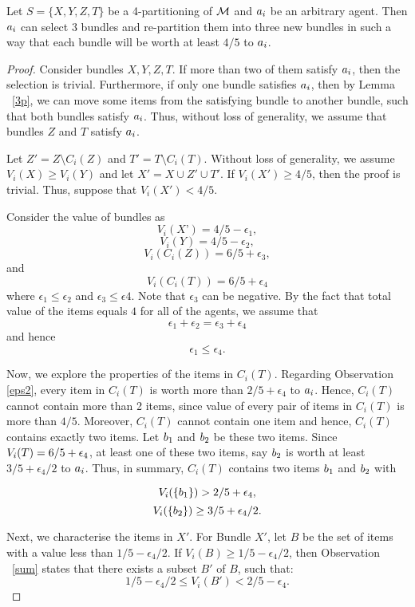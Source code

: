 \begin{lemma}
\label{core}
Let $S=\{X,Y,Z,T\}$ be a 4-partitioning of $\cal M$ and $a_i$ be an arbitrary agent. Then $a_i$ can select $3$ bundles and re-partition them into three new bundles in such a way that each bundle will be worth at least $4/5$ to $a_i$.
\end{lemma}
\begin{proof}
Consider bundles $X,Y,Z,T$. If more than two of them satisfy $a_i$, then the selection is trivial. Furthermore, if only one bundle satisfies $a_i$, then by Lemma ~\ref{3p}, we can move some items from the satisfying bundle to another bundle, such that both bundles satisfy $a_i$. Thus, without loss of generality, we assume that bundles $Z$ and $T$ satisfy $a_i$. 


Let $Z' = Z \setminus C_i(Z)$ and $T'= T \setminus C_i(T)$. Without loss of generality, we assume $V_i(X) \geq V_i(Y)$ and let $X' = X \cup Z' \cup T'$. If $V_i(X') \ge 4/5$, then the proof is trivial. Thus, suppose that $V_i(X') < 4/5$.

Consider the value of bundles as $$V_i(X’)=4/5 - \epsilon_1,$$ $$V_i(Y)=4/5 - \epsilon_2,$$ $$V_i(C_i(Z))=6/5 + \epsilon_3,$$ and $$V_i(C_i(T))=6/5 + \epsilon_4$$ where $\epsilon_1 \leq \epsilon_2$ and $\epsilon_3 \leq \epsilon 4$. Note that $\epsilon_3$ can be negative. By the fact that total value of the items equals $4$ for all of the agents, we assume that $$\epsilon_1 + \epsilon_2 = \epsilon_3 + \epsilon_4$$ and hence $$\epsilon_1 \leq \epsilon_4.$$  


Now, we explore the properties of the items in $C_i(T)$. Regarding Observation \ref{eps2}, every item in $C_i(T)$ is worth more than $2/5+\epsilon_4$ to $a_i$. Hence, $C_i(T)$ cannot contain more than 2 items, since value of every pair of items in $C_i(T)$ is more than $4/5$. Moreover, $C_i(T)$ cannot contain one item and hence, $C_i(T)$ contains exactly two items. Let $b_1$ and $b_2$ be these two items. Since $V_i(T) = 6/5 + \epsilon_4$, at least one of these two items, say $b_2$ is worth at least $3/5+\epsilon_4/2$ to $a_i$. Thus, in summary, $C_i(T)$ contains two items $b_1$ and $b_2$ with

$$V_i(\{b_1\}) >2/5 + \epsilon_4,$$
$$V_i(\{b_2\}) \geq 3/5+\epsilon_4/2.$$

Next, we characterise the items in $X'$. For Bundle $X'$, let $B$ be the set of items with a value less than $1/5 - \epsilon_4/2$. If $V_i(B)\geq 1/5 - \epsilon_4/2$, then Observation ~\ref{sum} states that there exists a subset $B'$ of $B$, such that:
$$1/5 - \epsilon_4/2 \leq V_i(B') < 2/5 - \epsilon_4.$$


\end{proof}
